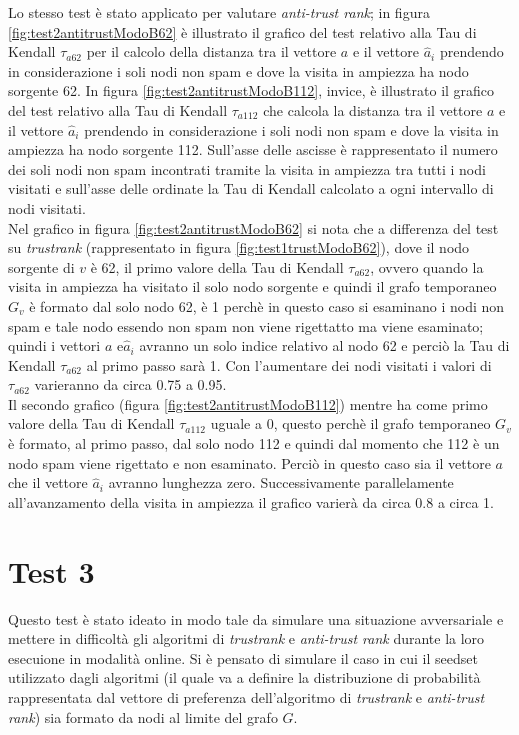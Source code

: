 Lo stesso test è stato applicato per valutare \textit{anti-trust rank}; in figura \ref{fig:test2antitrustModoB62} è illustrato il grafico del test relativo alla Tau di Kendall \(\tau_{a62}\) per il calcolo della distanza tra il vettore \(a\) e il vettore \(\hat{a}_i\) prendendo in considerazione i soli nodi non spam e dove  la visita in ampiezza ha nodo sorgente 62. In figura \ref{fig:test2antitrustModoB112}, invice, è illustrato il grafico del test relativo alla Tau di Kendall \(\tau_{a112}\) che  calcola la distanza tra il vettore \(a\) e il vettore \(\hat{a}_i\) prendendo in considerazione i soli nodi non spam e dove la visita in ampiezza ha nodo sorgente 112. Sull'asse delle ascisse è rappresentato il numero dei soli nodi non spam incontrati tramite la visita in ampiezza tra tutti i nodi visitati e sull'asse delle ordinate la Tau di Kendall calcolato a ogni intervallo di nodi visitati.\\
Nel grafico in figura \ref{fig:test2antitrustModoB62} si nota che a differenza del test su \textit{trustrank} (rappresentato in figura \ref{fig:test1trustModoB62}), dove il nodo sorgente di \(v\) è 62, il primo valore della Tau di Kendall \(\tau_{a62}\), ovvero quando la visita in ampiezza ha visitato il solo nodo sorgente e quindi il grafo temporaneo \(G_v\) è formato dal solo nodo 62, è 1 perchè in questo caso si esaminano i nodi non spam e tale nodo essendo non spam non viene rigettatto ma viene esaminato; quindi i vettori \(a\) e\(\hat{a}_i\) avranno un solo indice relativo al nodo 62 e perciò la Tau di Kendall \(\tau_{a62}\) al primo passo sarà 1. Con l'aumentare dei nodi visitati i valori di \(\tau_{a62}\) varieranno da circa 0.75 a 0.95. \\
Il secondo grafico (figura \ref{fig:test2antitrustModoB112}) mentre ha come primo valore della Tau di Kendall \(\tau_{a112}\) uguale a 0, questo perchè il grafo temporaneo \(G_v\) è formato, al primo passo,  dal solo nodo 112 e quindi dal momento che 112 è un nodo spam viene rigettato e non esaminato. Perciò in questo caso sia il vettore \(a\) che il vettore \(\hat{a}_i\) avranno lunghezza zero. Successivamente parallelamente all'avanzamento della visita in ampiezza il grafico varierà da circa 0.8 a circa 1.

\section{Test 3}
Questo test è stato ideato in modo tale da simulare una situazione avversariale e mettere in difficoltà gli algoritmi di \textit{trustrank} e \textit{anti-trust rank} durante la loro esecuione in modalità online. Si è pensato di simulare il caso in cui il seedset  utilizzato dagli algoritmi (il quale va a definire la distribuzione di probabilità rappresentata dal vettore di preferenza dell'algoritmo di \textit{trustrank} e \textit{anti-trust rank}) sia formato da nodi al limite del grafo \(G\).

